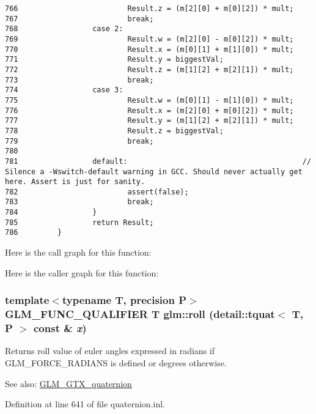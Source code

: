 \begin{Code}
\begin{verbatim}
766                         Result.z = (m[2][0] + m[0][2]) * mult;
767                         break;
768                 case 2:
769                         Result.w = (m[2][0] - m[0][2]) * mult;
770                         Result.x = (m[0][1] + m[1][0]) * mult;
771                         Result.y = biggestVal;
772                         Result.z = (m[1][2] + m[2][1]) * mult;
773                         break;
774                 case 3:
775                         Result.w = (m[0][1] - m[1][0]) * mult;
776                         Result.x = (m[2][0] + m[0][2]) * mult;
777                         Result.y = (m[1][2] + m[2][1]) * mult;
778                         Result.z = biggestVal;
779                         break;
780                         
781                 default:                                        // Silence a -Wswitch-default warning in GCC. Should never actually get here. Assert is just for sanity.
782                         assert(false);
783                         break;
784                 }
785                 return Result;
786         }
\end{verbatim}
\end{Code}




Here is the call graph for this function:

Here is the caller graph for this function:\hypertarget{group__gtc__quaternion_g3f58a75c69ff56cb9c83ea237abc1414}{
\subsubsection[roll]{\setlength{\rightskip}{0pt plus 5cm}template$<$typename T, precision P$>$ GLM\_\-FUNC\_\-QUALIFIER T glm::roll (detail::tquat$<$ T, P $>$ const \& {\em x})}}
\label{group__gtc__quaternion_g3f58a75c69ff56cb9c83ea237abc1414}


Returns roll value of euler angles expressed in radians if GLM\_\-FORCE\_\-RADIANS is defined or degrees otherwise.

\begin{Desc}
\item[See also:]\hyperlink{group__gtx__quaternion}{GLM\_\-GTX\_\-quaternion} \end{Desc}


Definition at line 641 of file quaternion.inl.


